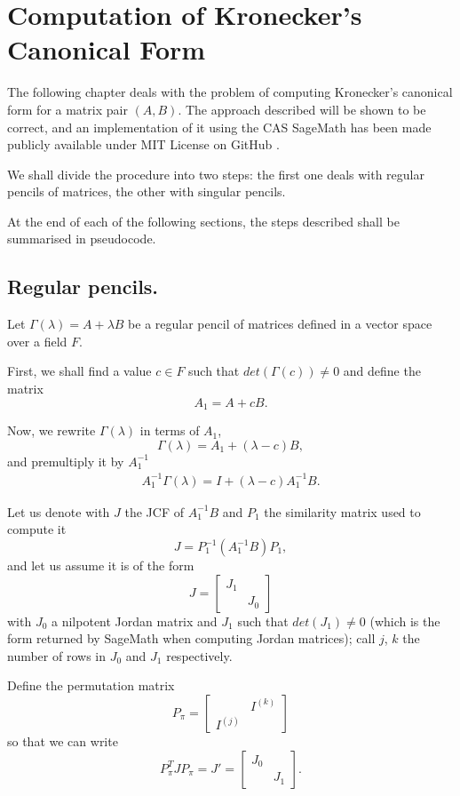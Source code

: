 \section{Computation of Kronecker's Canonical Form}
The following chapter deals with the problem of computing Kronecker's canonical form for a matrix pair \((A, B)\).
The approach described will be shown to be correct, and an implementation
of it using the CAS SageMath has been made publicly available under MIT License on GitHub
\cite{Trapani_Computation_of_Kronecker_s}.


We shall divide the procedure into two steps: the first one deals with regular pencils of matrices, the other with
singular pencils.

At the end of each of the following sections, the steps described shall be summarised in pseudocode.

\subsection*{Regular pencils.}
Let \(\Gamma(\lambda) = A + \lambda B\) be a regular pencil of matrices defined in a vector space over a
field \(F\).

First, we shall find a value \(c \in F\) such that \(det(\Gamma(c)) \neq 0\) and define the matrix 
\[
    A_{1} = A + cB.
\]

Now, we rewrite \(\Gamma(\lambda)\) in terms of \(A_{1}\),
\[
    \Gamma(\lambda) = A_{1} + (\lambda - c)B,
\]
and premultiply it by \(A_{1}^{-1}\)
\begin{gather}
    A_{1}^{-1} \Gamma(\lambda) = I + (\lambda - c)A_{1}^{-1}B. \label{gamma-reg-1}
\end{gather}

Let us denote with \(J\) the JCF of \(A_{1}^{-1}B\) and \(P_{1}\) the similarity matrix used to compute it
\[
    J = P_{1}^{-1}(A_{1}^{-1}B)P_{1},
\]
and let us assume it is of the form
\[
    J =
    \begin{bmatrix}
        J_{1} & \\
        & J_{0}
    \end{bmatrix}
\]
with \(J_{0}\) a nilpotent Jordan matrix and \(J_{1}\) such that \(det(J_{1}) \neq 0\) (which is the form returned by
SageMath when computing Jordan matrices); call \(j\), \(k\) the number of rows in \(J_{0}\) and \(J_{1}\) respectively.

Define the permutation matrix
\[
    P_{\pi} =
    \begin{bmatrix}
        & I^{(k)}\\
        I^{(j)} &
    \end{bmatrix}
\]
so that we can write
\[
    P_{\pi}^T J P_{\pi} = J' =
    \begin{bmatrix}
        J_{0} & \\
        & J_{1}
    \end{bmatrix}.
\]

